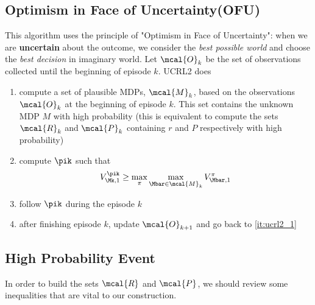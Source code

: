     \subsection{Optimism in Face of Uncertainty(OFU)}
    \label{subsec:OFU}
    
    This algorithm uses the principle of "Optimism in Face of Uncertainty": when we are \textbf{uncertain} about the outcome, we consider the \textit{best possible world} and choose the \textit{best decision} in imaginary world. Let $\mcal{O}_k$ be the set of observations collected until the beginning of episode $k$. UCRL2 does
        \begin{enumerate}
            \item \label{it:ucrl2_1} compute a set of plausible MDPs, $\mcal{M}_k$, based on the observations $\mcal{O}_k$ at the beginning of episode $k$. This set contains the unknown MDP $M$ with high probability (this is equivalent to compute the sets $\mcal{R}_k$ and $\mcal{P}_k$ containing $r$ and $P$ respectively with high probability)
            \item compute $\pik$ such that
                \begin{align}
                    V_{\Mk,1}^{\pik} \ge \max_{\pi}\max_{\Mbar\in\mcal{M}_k} V_{\Mbar,1}^\pi
                \end{align}
            \item follow $\pik$ during the episode $k$
            \item after finishing episode $k$, update $\mcal{O}_{k+1}$ and go back to \ref{it:ucrl2_1}
        \end{enumerate}
    
    \subsection{High Probability Event}
    \label{subsec:high_prob_event}
        In order to build the sets $\mcal{R}$ and $\mcal{P}$, we should review some inequalities that are vital to our construction.
    
